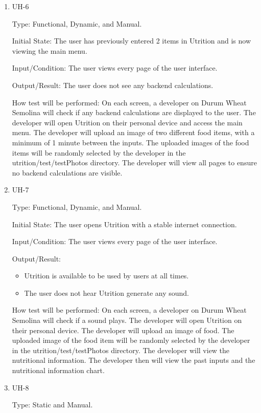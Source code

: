\documentclass[12pt, titlepage]{article}
\begin{document}
\begin{enumerate}
		\item{UH-6}
		
		Type: Functional, Dynamic, and Manual.
		
		Initial State: The user has previously entered 2 items in Utrition and is now viewing the main menu.
		
		Input/Condition: The user views every page of the user interface.
		
		Output/Result: The user does not see any backend calculations.
		
		How test will be performed: On each screen, a developer on Durum Wheat Semolina will check if any backend calculations are displayed to the user. The developer will open Utrition on their personal device and access the main menu. The developer will upload an image of two different food items, with a minimum of 1 minute between the inputs. The uploaded images of the food items will be randomly selected by the developer in the utrition/test/testPhotos directory. The developer will view all pages to ensure no backend calculations are visible.
		
		\item{UH-7}
		
		Type: Functional, Dynamic, and Manual.
		
		Initial State: The user opens Utrition with a stable internet connection.
		
		Input/Condition: The user views every page of the user interface.
		
		Output/Result: 
		\begin{itemize}
			\item Utrition is available to be used by users at all times.
			\item The user does not hear Utrition generate any sound.
		\end{itemize}
		
		How test will be performed: On each screen, a developer on Durum Wheat Semolina will check if a sound plays. The developer will open Utrition on their personal device. The developer will upload an image of food. The uploaded image of the food item will be randomly selected by the developer in the utrition/test/testPhotos directory. The developer will view the nutritional information. The developer then will view the past inputs and the nutritional information chart.
		
		\item{UH-8}
		
		Type: Static and Manual.
		

\end{enumerate}
\end{document}
